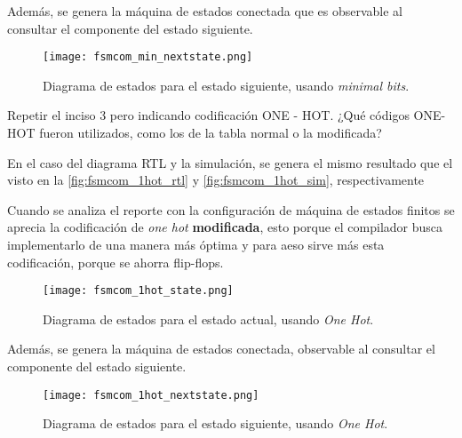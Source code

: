 \enter

Además, se genera la máquina de estados conectada que es observable al consultar el componente del estado siguiente.
\begin{figure}[ht]
	\centering
	\texttt{[image: fsmcom\_min\_nextstate.png]}
	\caption{
		Diagrama de estados para el estado siguiente, usando \textit{minimal bits}.
		\label{fig:fsmcom_min_nextstate}
	}
\end{figure}








\clearpage
\begin{center}
	\begin{minipage}{10cm}
		Repetir el inciso 3 pero indicando codificación ONE - HOT. ¿Qué códigos ONE-HOT fueron
		utilizados, como los de la tabla normal o la modificada?
	\end{minipage}
\end{center}

\enter

En el caso del diagrama RTL y la simulación, se genera el mismo resultado que
el visto en la \autoref{fig:fsmcom_1hot_rtl} y \autoref{fig:fsmcom_1hot_sim}, 
respectivamente

\enter

Cuando se analiza el reporte con la configuración de máquina de estados finitos
se aprecia la codificación de \textit{one hot} \textbf{modificada}, esto porque el compilador busca implementarlo de una manera más óptima y para aeso sirve más esta codificación, porque se ahorra flip-flops.
\begin{figure}[ht]
	\centering
	\texttt{[image: fsmcom\_1hot\_state.png]}
	\caption{
		Diagrama de estados para el estado actual, usando \textit{One Hot}.
		\label{fig:fsmcom_1hot_state}
	}
\end{figure}

Además, se genera la máquina de estados conectada, observable al consultar el componente del estado siguiente.
\begin{figure}[ht]
	\centering
	\texttt{[image: fsmcom\_1hot\_nextstate.png]}
	\caption{
		Diagrama de estados para el estado siguiente, usando \textit{One Hot}.
		\label{fig:fsmcom_1hot_nextstate}
	}
\end{figure}






